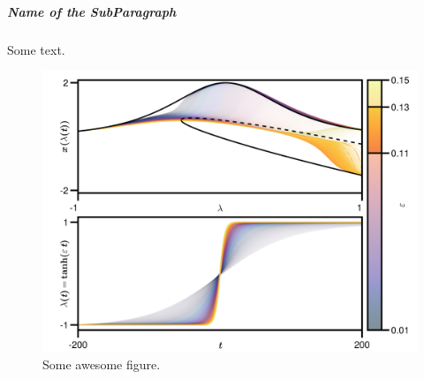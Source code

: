 \documentclass[../main.tex]{subfiles}
\begin{document}
\subparagraph{Name of the SubParagraph}\label{subpar:label}

Some text.

\begin{figure}[H]
    \centering 
    \includegraphics[keepaspectratio, width=\textwidth]{../figures/some_figure.png}
    \caption{Some awesome figure.}
    \label{fig:label}
\end{figure}
\end{document}
